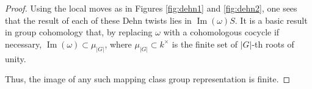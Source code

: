 \documentclass{amsart}
\DeclareMathOperator{\Img}{Im}
\begin{document}
\begin{proof}
 Using the local moves as in Figures \ref{fig:dehn1} and \ref{fig:dehn2}, one sees that the result of each of these Dehn twists lies in $\Img(\omega) S$.  It is a basic result in group cohomology that, by replacing $\omega$ with a cohomologous cocycle if necessary, $\Img(\omega) \subset \mu_{|G|}$, where $\mu_{|G|} \subset k^\times$ is the finite set of $|G|$-th roots of unity.  

Thus, the image of any such mapping class group representation is finite.
\end{proof}

\medskip
 


\end{document}
